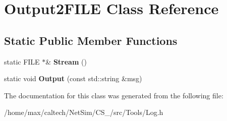 \hypertarget{classOutput2FILE}{\section{\-Output2\-F\-I\-L\-E \-Class \-Reference}
\label{classOutput2FILE}
}
\subsection*{\-Static \-Public \-Member \-Functions}
\begin{DoxyCompactItemize}
\item 
\hypertarget{classOutput2FILE_a10f20b32157af0d88e5ad9710f2dbd6e}{static \-F\-I\-L\-E $\ast$\& {\bfseries \-Stream} ()}\label{classOutput2FILE_a10f20b32157af0d88e5ad9710f2dbd6e}

\item 
\hypertarget{classOutput2FILE_a4e36a13eb54de8a0c81a90156d66f021}{static void {\bfseries \-Output} (const std\-::string \&msg)}\label{classOutput2FILE_a4e36a13eb54de8a0c81a90156d66f021}

\end{DoxyCompactItemize}


\-The documentation for this class was generated from the following file\-:\begin{DoxyCompactItemize}
\item 
/home/max/caltech/\-Net\-Sim/\-C\-S\-\_/src/\-Tools/\-Log.\-h\end{DoxyCompactItemize}
